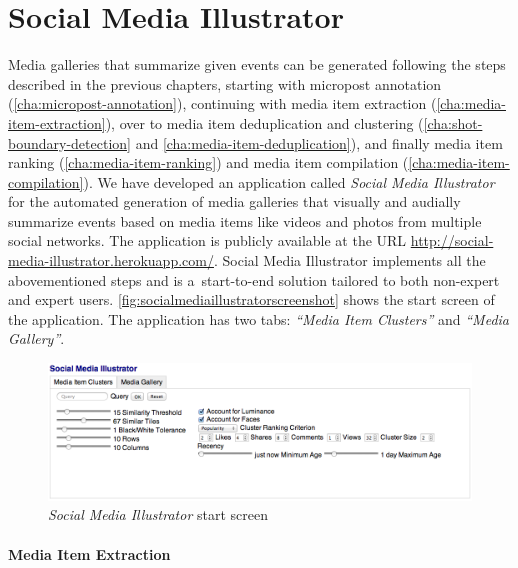 \section{Social Media Illustrator}
\label{sec:socialmediaillustrator}

Media galleries that summarize given events
can be generated following the steps described in the previous chapters,
starting with micropost annotation (\autoref{cha:micropost-annotation}), continuing with media item extraction
(\autoref{cha:media-item-extraction}),
over to media item deduplication and clustering
(\autoref{cha:shot-boundary-detection} and  
\autoref{cha:media-item-deduplication}), and finally
media item ranking (\autoref{cha:media-item-ranking}) and
media item compilation (\autoref{cha:media-item-compilation}).
We have developed an application called \emph{Social Media Illustrator}
for the automated generation of
media galleries that visually and audially summarize events
based on media items like videos and photos from multiple social networks.
The application is publicly available at the URL 
\url{http://social-media-illustrator.herokuapp.com/}.
Social Media Illustrator implements all the abovementioned steps
and is a~start-to-end solution tailored to both
non-expert and expert users.
\autoref{fig:socialmediaillustratorscreenshot}
shows the start screen of the application.
The application has two tabs: \emph{``Media Item Clusters''} and \emph{``Media Gallery''}.

\begin{figure}[!ht]
  \centering
  \includegraphics[width=1\columnwidth]{socialmediaillustrator.png}
  \caption{\emph{Social Media Illustrator} start screen}
  \label{fig:socialmediaillustratorscreenshot}
\end{figure}

\paragraph{Media Item Extraction}

